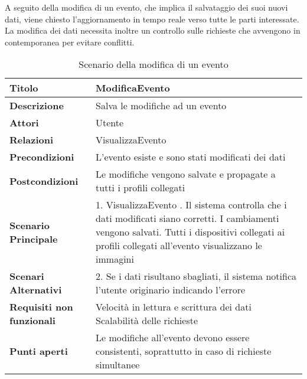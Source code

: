 \clearpage
A seguito della modifica di un evento, che implica il salvataggio dei suoi nuovi dati, viene chiesto l'aggiornamento in tempo reale verso tutte le parti interessate.
La modifica dei dati necessita inoltre un controllo sulle richieste che avvengono in contemporanea per evitare conflitti.\\
\begin{table}[htbp]
    \begin{tabular} {|P{4.5cm}|P{11cm}|}
        \hline
        \textbf{Titolo}                   & ModificaEvento                                                                                 \\
        \hline
        \textbf{Descrizione}              & Salva le modifiche ad un evento                                                                \\
        \hline
        \textbf{Attori}                   & Utente                                                                                         \\
        \hline
        \textbf{Relazioni}                & VisualizzaEvento                                                                               \\
        \hline
        \textbf{Precondizioni}            & L'evento esiste e sono stati modificati dei dati                                               \\
        \hline
        \textbf{Postcondizioni}           & Le modifiche vengono salvate e propagate a tutti i profili collegati                           \\
        \hline
        \textbf{Scenario Principale}      & 1. VisualizzaEvento . Il sistema controlla che i dati modificati siano corretti. I cambiamenti vengono salvati. Tutti i dispositivi collegati ai profili collegati all'evento visualizzano le immagini                                          \\
        \hline
        \textbf{Scenari Alternativi}      & 2. Se i dati risultano sbagliati, il sistema notifica l'utente originario indicando l'errore   \\
        \hline
        \textbf{Requisiti non funzionali} & Velocità in lettura e scrittura dei dati \newline
        Scalabilità delle richieste                                                                                                        \\
        \hline
        \textbf{Punti aperti}             & Le modifiche all'evento devono essere consistenti, soprattutto in caso di richieste simultanee \\
        \hline
    \end{tabular}
    \caption{Scenario della modifica di un evento}
\end{table}

